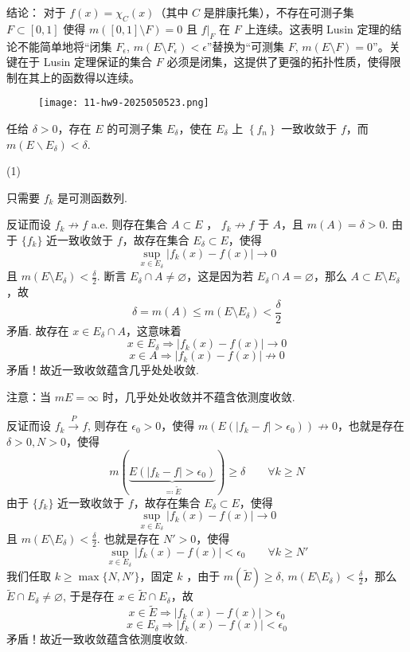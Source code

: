 结论： 对于 $f(x)=\chi_C(x)$（其中 $C$ 是胖康托集），不存在可测子集 $F \subset [0,1]$ 使得 $m([0,1] \setminus F)=0$ 且 $f|_F$ 在 $F$ 上连续。这表明 Lusin 定理的结论不能简单地将“闭集 $F_\epsilon$, $m(E \setminus F_\epsilon) < \epsilon$”替换为“可测集 $F$, $m(E \setminus F)=0$”。关键在于 Lusin 定理保证的集合 $F$ 必须是闭集，这提供了更强的拓扑性质，使得限制在其上的函数得以连续。

\begin{exercise}
\begin{figure}[H]
\centering
\texttt{[image: 11-hw9-2025050523.png]}
\label{}
\end{figure}
\end{exercise}
\begin{definition}[近一致收敛]
任给 $\delta>0$，存在 $E$ 的可测子集 $E_\delta$，使在 $E_\delta$ 上 $\left\{f_n\right\}$ 一致收敛于 $f$，而 $m\left(E \backslash E_\delta\right)<\delta$.
\end{definition}
(1)

\begin{note}
只需要 $f_k$ 是可测函数列.
\end{note}
反证而设 $f_k \not\to f$ a.e. 则存在集合 $A\subset E$ ， $f_k\not\to f$ 于 $A$，且 $m (A)=\delta>0$. 由于 $\{ f_k \}$ 近一致收敛于 $f$，故存在集合 $E_{\delta}\subset E$，使得
\[
\sup_{x\in E_{\delta}}\lvert f_k(x)-f(x) \rvert \to0
\]
且 $m(E\setminus E_{\delta})<\frac{\delta}{2}$. 断言 $E_{\delta}\cap A\neq \varnothing$，这是因为若 $E_{\delta}\cap A=\varnothing$，那么 $A\subset E\setminus E_{\delta}$，故
\[
\delta=m(A)\leq m(E\setminus E_{\delta})<\frac{\delta}{2}
\]
矛盾. 故存在 $x\in E_{\delta}\cap A$，这意味着
\[
x\in E_{\delta}\Rightarrow\lvert f_k(x)-f(x) \rvert \to0
\]
\[
x\in A\Rightarrow \lvert f_k(x)-f(x) \rvert \not\to0
\]
矛盾！故近一致收敛蕴含几乎处处收敛.

\begin{remark}
注意：当 $mE=\infty$ 时，几乎处处收敛并不蕴含依测度收敛.
\end{remark}
反证而设 $f_k\overset{ P }{ \to }f$, 则存在 $\epsilon_0>0$，使得 $m (E (\lvert f_k-f \rvert>\epsilon_0))\not\to0$，也就是存在 $\delta>0,N>0$，使得
\[
m(\underbrace{ E(\lvert f_k-f \rvert >\epsilon_0) }_{ \eqqcolon \widetilde{E} })\geq \delta \qquad \forall k\geq N
\]
由于 $\{ f_k \}$ 近一致收敛于 $f$，故存在集合 $E_{\delta}\subset E$，使得
\[
\sup_{x\in E_{\delta}}\lvert f_k(x)-f(x) \rvert \to0
\]
且 $m(E\setminus E_{\delta})<\frac{\delta}{2}$. 也就是存在 $N'>0$，使得
\[
\sup_{x\in E_{\delta}}\lvert f_k(x)-f(x) \rvert <\epsilon_0 \qquad \forall k\geq N'
\]
我们任取 $k\geq \max\{ N,N' \}$，固定 $k$ ，由于 $m(\widetilde{E})\geq\delta$, $m(E\setminus E_{\delta})<\frac{\delta}{2}$，那么 $\widetilde{E}\cap E_{\delta}\neq \varnothing$, 于是存在 $x\in \widetilde{E}\cap E_{\delta}$，故
\[
x\in \widetilde{E}\Rightarrow \lvert f_k(x)-f(x) \rvert >\epsilon_0
\]
\[
x\in E_{\delta}\Rightarrow \lvert f_k(x)-f(x) \rvert <\epsilon_0
\]
矛盾！故近一致收敛蕴含依测度收敛.

